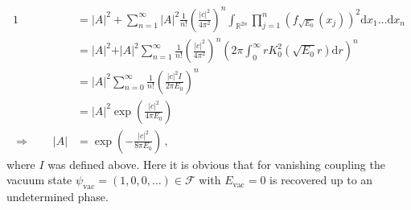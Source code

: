 \begin{align*}
  1
  &=
  \vert A \vert^{2}
  +
  \sum_{n = 1}^{\infty}
  \vert A \vert^{2}
  \frac{1}{n!}
  \left(
    \frac{\vert c \vert^{2}}{4\pi^{2}}
  \right)^{n}
  \int_{\mathbb{R}^{2n}}
  \prod_{j = 1}^{n}
  \left(
    f_{\sqrt{E_{0}}}(x_{j})
  \right)^{2}
  \mathrm{d}x_{1}
  \dots
  \mathrm{d}x_{n}
  \\
  &=
  \vert A \vert^{2}
  +
  \vert A \vert^{2}
  \sum_{n = 1}^{\infty}
  \frac{1}{n!}
  \left(
    \frac{\vert c \vert^{2}}{4\pi^{2}}
  \right)^{n}
  \left(
    2\pi
    \int_{0}^{\infty}
    r
    K_{0}^{2}
    \left(
      \sqrt{E_{0}}
      r
    \right)
    \mathrm{d}r
  \right)^{n}
  \\
  &=
  \vert A \vert^{2}
  \sum_{n = 0}^{\infty}
  \frac{1}{n!}
  \left(
    \frac{\vert c \vert^{2}I}{2\pi E_{0}}
  \right)^{n}
  \\
  &=
  \vert A \vert^{2}
  \exp
  \left(
    \frac{\vert c \vert^{2}}{4\pi E_{0}}
  \right)
  \\
  \Rightarrow
  \qquad
  \vert A \vert
  &=
  \exp
  \left(
    -
    \frac{\vert c \vert^{2}}{8\pi E_{0}}
  \right)
  \,,
\end{align*}
where $I$ was defined above. Here it is obvious that for vanishing coupling the vacuum state $\psi_{\textrm{vac}} = (1,0,0,\dots) \in \mathcal{F}$ with $E_{\textrm{vac}} = 0$ is recovered up to an undetermined phase.
